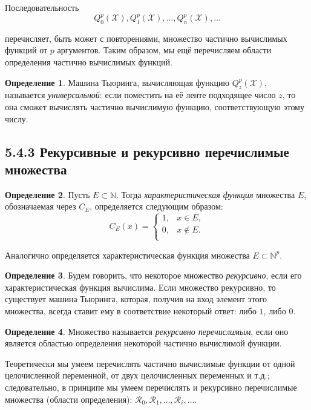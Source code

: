 \documentclass[a4paper, 12pt]{article}  %
\theoremstyle{definition}
\newtheorem*{definition}{Определение}
\begin{document}
		Последовательность
		$$Q^p_0(\mathscr{X}), Q^p_1(\mathscr{X}), \dots, Q^p_n(\mathscr{X}), \dots$$
		
		перечисляет, быть может с повторениями, множество частично вычислимых функций от $p$ аргументов.
		Таким образом, мы ещё перечисляем области определения частично вычислимых функций.
		
		\begin{definition}
			Машина Тьюринга, вычисляющая функцию $Q^p_z(\mathscr{X})$, называется \textit{универсальной}:
			если поместить на её ленте подходящее число $z$, то она сможет вычислять частично вычислимую
			функцию, соответствующую этому числу.
		\end{definition}
		
	\subsection*{5.4.3 Рекурсивные и рекурсивно перечислимые множества}
	
		\begin{definition}
			Пусть $E \subset \mathbb{N}$. Тогда \textit{характеристическая функция} множества $E$,
			обозначаемая через $C_E$, определяется следующим образом:
			\[
				C_E(x) =  
					\begin{cases}
						1, & x \in E, \\
						0, & x \notin E. \\
					\end{cases}
			\]			
			
			Аналогично определяется характеристическая функция множества $E \subset \mathbb{N}^p$.
		\end{definition}
	
		\begin{definition}
			Будем говорить, что некоторое множество \textit{рекурсивно}, если его характеристическая
			функция вычислима. Если множество рекурсивно, то существует машина Тьюринга, которая, получив
			на вход элемент этого множества, всегда ставит ему в соответствие некоторый ответ: либо $1$,
			либо $0$.
		\end{definition}
	
		\begin{definition}
			Множество называется \textit{рекурсивно перечислимым}, если оно является областью определения
			некоторой частично вычислимой функции.
		\end{definition}
	
		Теоретически мы умеем перечислять частично вычислимые функции от одной целочисленной переменной, от
		двух целочисленных переменных и т.д.; следовательно, в принципе мы умеем перечислять и рекурсивно
		перечислимые множества (области определения):
		$\mathscr{R}_0, \mathscr{R}_1, \dots, \mathscr{R}_i, \dots$.
		
\end{document}

